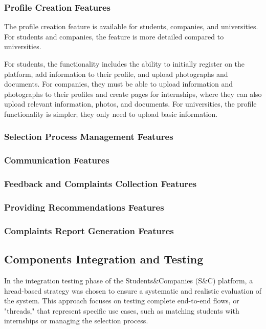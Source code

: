 \subsubsection{Profile Creation Features}

The profile creation feature is available for students, companies, and universities.
For students and companies, the feature is more detailed compared to universities. 

For students, the functionality includes the ability to initially register on the
platform, add information to their profile, and upload photographs and documents.  
For companies, they must be able to upload information and photographs to their
profiles and create pages for internships, where they can also upload relevant information,
photos, and documents.  
For universities, the profile functionality is simpler; they only need to upload basic information.  

\subsubsection{Selection Process Management Features}
\subsubsection{Communication Features}
\subsubsection{Feedback and Complaints Collection Features}
\subsubsection{Providing Recommendations Features}
\subsubsection{Complaints Report Generation Features}

\subsection{Components Integration and Testing}

In the integration testing phase of the Students\&Companies (S\&C) platform, a hread-based strategy
was chosen to ensure a systematic and realistic evaluation of the system. This approach focuses on
testing complete end-to-end flows, or "threads," that represent specific use cases, such as matching
students with internships or managing the selection process. 

